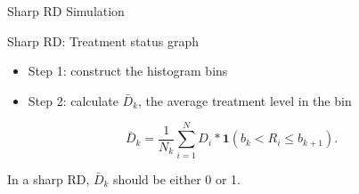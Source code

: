 \documentclass[
  ignorenonframetext,
]{beamer}
\newenvironment{Shaded}{\begin{snugshade}}{\end{snugshade}}
\newcommand{\CommentTok}[1]{\textcolor[rgb]{0.56,0.35,0.01}{\textit{#1}}}
\newcommand{\DecValTok}[1]{\textcolor[rgb]{0.00,0.00,0.81}{#1}}
\newcommand{\FloatTok}[1]{\textcolor[rgb]{0.00,0.00,0.81}{#1}}
\newcommand{\NormalTok}[1]{#1}
\newcommand{\OtherTok}[1]{\textcolor[rgb]{0.56,0.35,0.01}{#1}}
\newcommand{\SpecialCharTok}[1]{\textcolor[rgb]{0.00,0.00,0.00}{#1}}
\begin{document}
\begin{frame}[fragile]{Sharp RD Simulation}
\protect\hypertarget{sharp-rd-simulation-2}{}
\small

\begin{Shaded}
\end{Shaded}
\end{frame}

\begin{frame}{Sharp RD: Treatment status graph}
\protect\hypertarget{sharp-rd-treatment-status-graph}{}
\begin{itemize}
\item
  Step 1: construct the histogram bins
\item
  Step 2: calculate \(\bar{D}_k\), the average treatment level in the
  bin
\end{itemize}

\[
\bar{D}_k=\frac{1}{N_k}\sum_{i=1}^ND_i*\mathbf{1}(b_k<R_i\leq b_{k+1}).
\]

In a sharp RD, \(\bar{D}_k\) should be either 0 or 1.
\end{frame}
\end{document}
